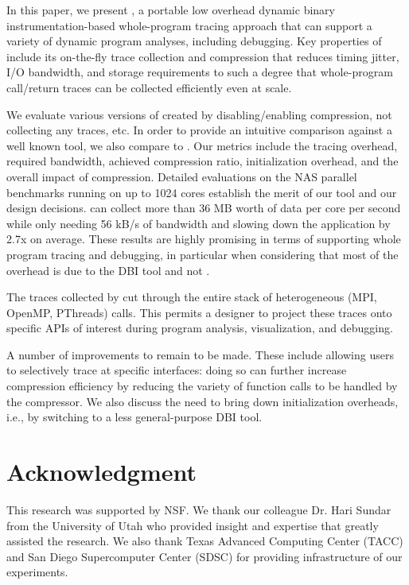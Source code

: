 
In this paper, 
we present \parlot, a portable low overhead dynamic
binary instrumentation-based
whole-program
tracing approach that can support a variety of 
dynamic program analyses, including debugging.
%
Key properties of \parlot include its on-the-fly trace collection and
compression that reduces timing jitter, I/O bandwidth, and storage requirements to such a degree that whole-program call/return traces can be collected efficiently even at scale. 

We evaluate various versions of \parlot
created by disabling/enabling compression, not collecting any traces, etc.
%
In order to provide an intuitive comparison against a well known tool,
we also compare \parlot to \callgrind.
%
Our metrics include the tracing overhead, required bandwidth, achieved compression ratio, initialization overhead, and the 
overall impact of compression.
%
Detailed evaluations on the NAS parallel benchmarks running on
up to 1024 cores establish the merit of our tool and our design decisions. 
\parlot can collect more than 36 MB worth of data per core per second while 
only needing 56 kB/s of bandwidth and slowing down the 
application by 2.7x on average.
%
These results are highly promising in terms of supporting 
whole program tracing and debugging, in particular when considering that most of the overhead is due to the DBI tool and not \parlot.


The traces collected by \parlot cut through the entire stack of heterogeneous
(MPI, OpenMP, PThreads) calls. 
%
This permits a designer to project these traces onto specific
APIs of interest during program analysis, visualization, and debugging.
%


A number of improvements to \parlot remain to be made.
%
These include allowing users to selectively trace at specific
interfaces: doing so can further increase compression efficiency
by reducing the variety of function calls to be handled by
the compressor.
%
We also discuss the need to bring down initialization overheads, i.e.,
by switching to a less general-purpose DBI tool.
%



\section{Acknowledgment}

This research was supported by NSF. We thank our colleague Dr. Hari Sundar from the University of Utah who provided insight and expertise that greatly assisted the research. We also thank Texas Advanced Computing Center (TACC) and San Diego Supercomputer Center (SDSC) for providing infrastructure of our experiments. 

